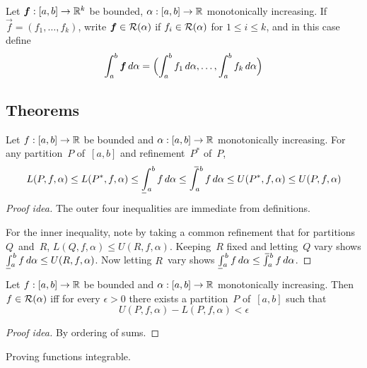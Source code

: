 \begin{defn}
Let \(\vec{f}:[a,b]\to\R^k\) be bounded, \(\alpha:[a,b]\to\R\) monotonically increasing. If \(\vec{f}=(f_1,\ldots,f_k)\), write \(\vec{f}\in\RI(\alpha)\) if \(f_i\in\RI(\alpha)\) for \(1\le i\le k\), and in this case define
\[\int_a^b\vec{f}\,d\alpha=\Bigl(\int_a^b f_1\,d\alpha,\ldots,\int_a^b f_k\,d\alpha\Bigr)\]
\end{defn}

\subsection*{Theorems}
\begin{thm}
Let \(f:[a,b]\to\R\) be bounded and \(\alpha:[a,b]\to\R\) monotonically increasing. For any partition~\(P\) of~\([a,b]\) and refinement~\(P^*\) of~\(P\),
\[L(P,f,\alpha)\le L(P^*,f,\alpha)\le\lowerint{a}{b}f\,d\alpha\le\upperint{a}{b}f\,d\alpha\le U(P^*,f,\alpha)\le U(P,f,\alpha)\]
\end{thm}
\begin{proof}[Proof idea]
The outer four inequalities are immediate from definitions.

For the inner inequality, note by taking a common refinement that for partitions \(Q\)~and~\(R\), \(L(Q,f,\alpha)\le U(R,f,\alpha)\). Keeping~\(R\) fixed and letting~\(Q\) vary shows \(\lowerint{a}{b}f\,d\alpha\le U(R,f,\alpha)\). Now letting \(R\)~vary shows \(\lowerint{a}{b}f\,d\alpha\le\upperint{a}{b}f\,d\alpha\).
\end{proof}

\begin{thm}
Let \(f:[a,b]\to\R\) be bounded and \(\alpha:[a,b]\to\R\) monotonically increasing. Then \(f\in\RI(\alpha)\) iff for every \(\epsilon>0\) there exists a partition~\(P\) of~\([a,b]\) such that
\[U(P,f,\alpha)-L(P,f,\alpha)<\epsilon\]
\end{thm}
\begin{proof}[Proof idea]
By ordering of sums.
\end{proof}
\begin{app}
Proving functions integrable.
\end{app}

